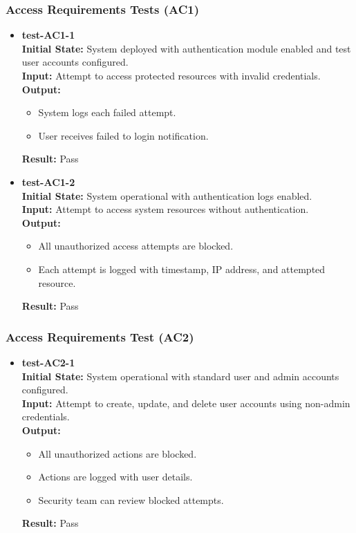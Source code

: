 \documentclass[12pt, titlepage]{article}
\begin{document}
\subsubsection{Access Requirements Tests (AC1)} \label{section:4.10.1}

\begin{itemize}
\item \textbf{test-AC1-1} \label{test-AC1-1} \\
\textbf{Initial State:} System deployed with authentication module enabled and test user accounts configured. \\
\textbf{Input:} Attempt to access protected resources with invalid credentials. \\
\textbf{Output:}
\begin{itemize}
\item System logs each failed attempt.
\item User receives failed to login notification.
\end{itemize}
\textbf{Result:} Pass \\

\item \textbf{test-AC1-2} \label{test-AC1-2} \\
\textbf{Initial State:} System operational with authentication logs enabled. \\
\textbf{Input:} Attempt to access system resources without authentication. \\
\textbf{Output:} 
\begin{itemize}
    \item All unauthorized access attempts are blocked.
    \item Each attempt is logged with timestamp, IP address, and attempted resource.
\end{itemize}
\textbf{Result:} Pass \\
\end{itemize}

\subsubsection{Access Requirements Test (AC2)} \label{section:4.10.2}

\begin{itemize}
\item \textbf{test-AC2-1} \label{test-AC2-1} \\
\textbf{Initial State:} System operational with standard user and admin accounts configured. \\
\textbf{Input:} Attempt to create, update, and delete user accounts using non-admin credentials. \\
\textbf{Output:}
\begin{itemize}
\item All unauthorized actions are blocked.
\item Actions are logged with user details.
\item Security team can review blocked attempts.
\end{itemize}
\textbf{Result:} Pass \\
\end{itemize}
\end{document}
